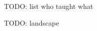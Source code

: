 \documentclass{article}
\begin{document}
TODO: list who taught what

TODO: landscape
\end{document}
